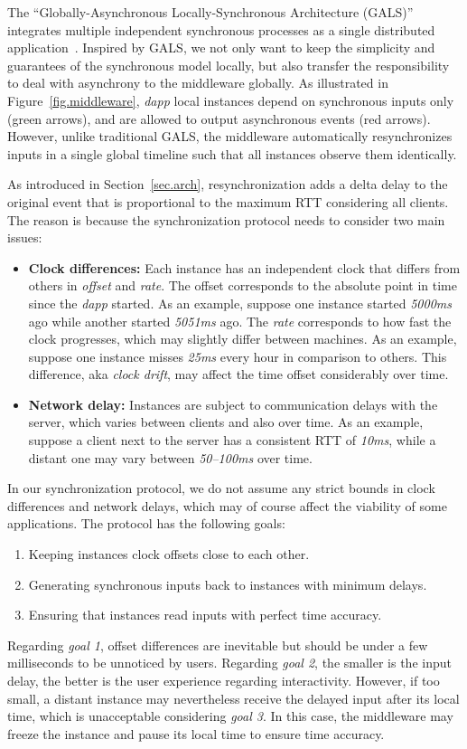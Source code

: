 \documentclass[sigplan,screen]{acmart}
\newcommand{\dapp}{\emph{dapp}\xspace}
\begin{document}
The ``Globally-Asynchronous Locally-Synchronous Architecture (GALS)''
integrates multiple independent synchronous processes as a single distributed
application~\cite{gals.taxonomy}.
%
Inspired by GALS, we not only want to keep the simplicity and guarantees of the
synchronous model locally, but also transfer the responsibility to deal with
asynchrony to the middleware globally.
%
As illustrated in Figure~\ref{fig.middleware}, \dapp local instances depend on
synchronous inputs only (green arrows), and are allowed to output asynchronous
events (red arrows).
%
However, unlike traditional GALS, the middleware automatically resynchronizes
inputs in a single global timeline such that all instances observe them
identically.

As introduced in Section~\ref{sec.arch}, resynchronization adds a delta delay
to the original event that is proportional to the maximum RTT considering all
clients.
The reason is because the synchronization protocol needs to consider two main
issues:
%
\begin{itemize}
\item \textbf{Clock differences:}
    Each instance has an independent clock that differs from others in
    \emph{offset} and \emph{rate}.
    The offset corresponds to the absolute point in time since the \dapp started.
    As an example, suppose one instance started \emph{5000ms} ago while another
    started \emph{5051ms} ago.
    The \emph{rate} corresponds to how fast the clock progresses, which may
    slightly differ between machines.
    As an example, suppose one instance misses \emph{25ms} every hour in
    comparison to others.
    This difference, aka \emph{clock drift}, may affect the time offset
    considerably over time.
\item \textbf{Network delay:}
    Instances are subject to communication delays with the server, which
    varies between clients and also over time.
    As an example, suppose a client next to the server has a consistent RTT of
    \emph{10ms}, while a distant one may vary between \emph{50--100ms} over
    time.
\end{itemize}
%
In our synchronization protocol, we do not assume any strict bounds in clock
differences and network delays, which may of course affect the viability of
some applications.
%
The protocol has the following goals:
%
\begin{enumerate}
\item Keeping instances clock offsets close to each other.
\item Generating synchronous inputs back to instances with minimum delays.
\item Ensuring that instances read inputs with perfect time accuracy.
\end{enumerate}
%
Regarding \emph{goal 1}, offset differences are inevitable but should be under
a few milliseconds to be unnoticed by users.
Regarding \emph{goal 2}, the smaller is the input delay, the better is the user
experience regarding interactivity.
However, if too small, a distant instance may nevertheless receive the delayed
input after its local time, which is unacceptable considering \emph{goal 3}.
In this case, the middleware may freeze the instance and pause its local time
to ensure time accuracy.
\end{document}
